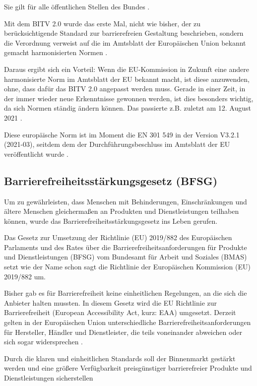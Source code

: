 Sie gilt für alle öffentlichen Stellen des Bundes \parencite[vgl.][]{bfj_bgg12_2025}.

Mit dem BITV 2.0 wurde das erste Mal, nicht wie bisher, der zu berücksichtigende Standard zur barrierefreien Gestaltung beschrieben, sondern die Verordnung verweist auf die im Amtsblatt der Europäischen Union bekannt gemacht harmonisierten Normen \parencite[vgl.][]{bfj_bitv3_2025}. 

Daraus ergibt sich ein Vorteil: Wenn die EU-Kommission in Zukunft eine andere harmonisierte Norm im Amtsblatt der EU bekannt macht, ist diese anzuwenden, ohne, dass dafür das BITV 2.0 angepasst werden muss. Gerade in einer Zeit, in der immer wieder neue Erkenntnisse gewonnen werden, ist dies besonders wichtig, da sich Normen ständig ändern können. Das passierte z.B. zuletzt am 12. August 2021 \parencite[vgl.][]{bbf_newversionnorm_2025}.

 Diese europäische Norm ist im Moment die EN 301 549 in der Version V3.2.1 (2021-03), seitdem dem der Durchführungsbeschluss im Amtsblatt der EU veröffentlicht wurde \parencite[vgl.][]{eu_2021/1339_2021}.

\subsection{Barrierefreiheitsstärkungsgesetz (BFSG)}

Um zu gewährleisten, dass Menschen mit Behinderungen, Einschränkungen und ältere Menschen gleichermaßen an Produkten und Dienstleistungen teilhaben können, wurde das Barrierefreiheitsstärkungsgesetz ins Leben gerufen.

Das Gesetz zur Umsetzung der Richtlinie (EU) 2019/882 des Europäischen Parlaments und des Rates über die Barrierefreiheitsanforderungen für Produkte und Dienstleistungen (BFSG) vom Bundesamt für Arbeit und Soziales (BMAS) setzt wie der Name schon sagt die Richtlinie der Europäischen Kommission (EU) 2019/882 um.

Bisher gab es für Barrierefreiheit keine einheitlichen Regelungen, an die sich die Anbieter halten mussten. In diesem Gesetz wird die EU Richtlinie zur Barrierefreiheit (European Accessibility Act, kurz: EAA) umgesetzt. Derzeit gelten in der Europäischen Union unterschiedliche Barrierefreiheitsanforderungen für Hersteller, Händler und Dienstleister, die teils voneinander abweichen oder sich sogar widersprechen \parencite[vgl.][]{bmas_teilhabebfsgstandards_nodate}.

Durch die klaren und einheitlichen Standards soll der Binnenmarkt gestärkt werden und eine größere Verfügbarkeit preisgünstiger barrierefreier Produkte und Dienstleistungen sicherstellen \parencite[vgl.][]{bmas_teilhabebfsg_nodate}


